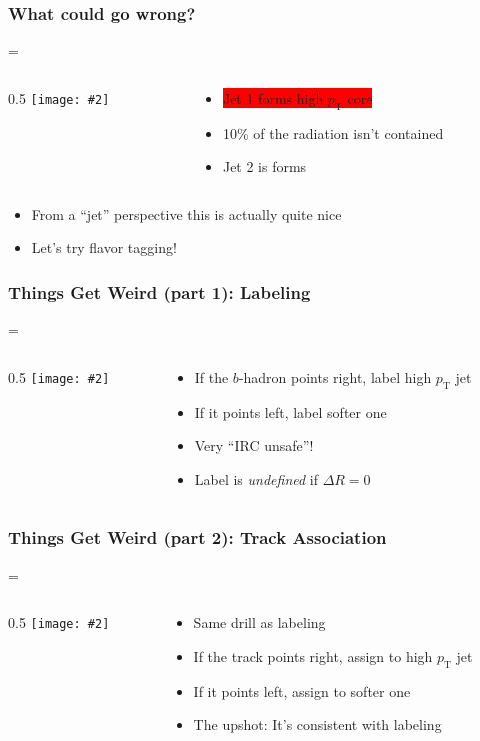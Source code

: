 \documentclass[xcolor={table}]{beamer}
\newcommand{\pt}{p_{\mathrm{T}}}
\newcommand{\graphic}[2][0.99]{\texttt{[image: \#2]}}
\newcommand{\twocol}[3][0.5]{
  \newdimen\scwid
  \scwid=\dimexpr\textwidth-#1\textwidth\relax
  \begin{columns}
    \begin{column}{#1\textwidth}#2\end{column}
      \begin{column}{\scwid}#3\end{column}
  \end{columns}
}
\begin{document}
\begin{frame}
  \frametitle{What could go wrong?}
  \twocol{
    \graphic{vr.pdf}
  }{
    \begin{itemize}
    \item \colorbox{red}{Jet 1 forms high $\pt$ core}
    \item 10\% of the radiation isn't contained
    \item \colorbox{red!50!}{Jet 2 is forms}
    \end{itemize}
  }
  \begin{itemize}
  \item From a ``jet'' perspective this is actually quite nice
  \item Let's try flavor tagging!
  \end{itemize}
\end{frame}

\begin{frame}
  \frametitle{Things Get Weird (part 1): Labeling}
  \twocol{
    \graphic{labeling.pdf}
  }{
    \begin{itemize}
    \item If the $b$-hadron points right, label
      \colorbox{blue!25!}{high $\pt$} jet
    \item If it points left, label \colorbox{blue!10!}{softer one}
    \item Very ``IRC unsafe''!
    \item Label is \emph{undefined} if $\Delta R = 0$
    \end{itemize}
  }
\end{frame}

\begin{frame}
  \frametitle{Things Get Weird (part 2): Track Association}
  \twocol{
    \graphic{tracking.pdf}
  }{
    \begin{itemize}
    \item Same drill as labeling
    \item If the track points right, assign to
      \colorbox{green!25!}{high $\pt$} jet
    \item If it points left, assign to \colorbox{green!10!}{softer one}
    \item The upshot: It's consistent with labeling
    \end{itemize}
  }
\end{frame}
\end{document}
